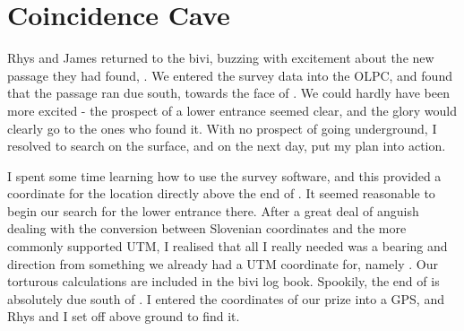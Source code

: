 \section{Coincidence Cave}
    \begin{marginfigure}
    \end{marginfigure}


    Rhys and James returned to the bivi, buzzing with excitement about the new passage they had found, . We entered the survey data into the OLPC, and found that the passage ran due south, towards the face of . We could hardly have been more excited - the prospect of a lower entrance seemed clear, and the glory would clearly go to the ones who found it. With no prospect of going underground, I resolved to search on the surface, and on the next day, put my plan into action.

    I spent some time learning how to use the survey software, and this provided a coordinate for the location directly above the end of . It seemed reasonable to begin our search for the lower entrance there. After a great deal of anguish dealing with the conversion between Slovenian coordinates and the more commonly supported UTM, I realised that all I really needed was a bearing and direction from something we already had a UTM coordinate for, namely . Our torturous calculations are included in the bivi log book. Spookily, the end of  is absolutely due south of . I entered the coordinates of our prize into a GPS, and Rhys and I set off above ground to find it.

